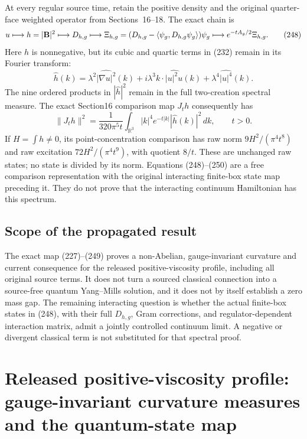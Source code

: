 \documentclass[11pt]{article}
\begin{document}
At every regular source time, retain the positive density and the original
quarter-face weighted operator from Sections~16--18. The exact chain is
\[
 u\longmapsto h=|{\bf B}|^2
 \longmapsto D_{h,g}
 \longmapsto \Xi_{h,g}=(D_{h,g}-\langle\psi_g,D_{h,g}\psi_g\rangle)\psi_g
 \longmapsto e^{-tA_g/2}\Xi_{h,g}.
\tag{248}
\]
Here \(h\) is nonnegative, but its cubic and quartic terms in (232) remain
in its Fourier transform:
\[
 \widehat h(k)=\lambda^2\widehat{|\nabla u|^2}(k)
 +i\lambda^3 k\cdot\widehat{|u|^2u}(k)
 +\lambda^4\widehat{|u|^4}(k).
\tag{249}
\]
The nine ordered products in \(|\widehat h|^2\) remain in the full
two-creation spectral measure. The exact Section16 comparison map
\(J_t h\) consequently has
\[
 \|J_t h\|^2=\frac1{320\pi^5t}\int_{\mathbb R^3}|k|^4e^{-t|k|}
 |\widehat h(k)|^2\,dk,\qquad t>0.
\tag{250}
\]
If \(H=\int h\ne0\), its point-concentration comparison has raw norm
\(9H^2/(\pi^4t^8)\) and raw excitation \(72H^2/(\pi^4t^9)\), with quotient
\(8/t\). These are unchanged raw states; no state is divided by its norm.
Equations (248)--(250) are a free comparison representation with the
original interacting finite-box state map preceding it. They do not prove
that the interacting continuum Hamiltonian has this spectrum.

\subsection{Scope of the propagated result}

The exact map (227)--(249) proves a non-Abelian, gauge-invariant curvature
and current consequence for the released positive-viscosity profile,
including all original source terms. It does not turn a sourced classical
connection into a source-free quantum Yang--Mills solution, and it does
not by itself establish a zero mass gap. The remaining interacting
question is whether the actual finite-box states in (248), with their
full \(D_{h,g}\), Gram corrections, and regulator-dependent interaction
matrix, admit a jointly controlled continuum limit. A negative or
divergent classical term is not substituted for that spectral proof.

\section{Released positive-viscosity profile: gauge-invariant curvature measures and the quantum-state map}
\label{sec:released-profile-measures}
\end{document}
